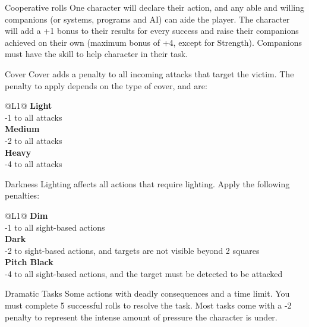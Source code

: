 \begin{genericsection}{Cooperative rolls}
One character will declare their action, and any able and willing companions (or systems, programs and AI) can aide the player. The character will add a +1 bonus to their results for every success and raise their companions achieved on their own (maximum bonus of +4, except for Strength). Companions must have the skill to help character in their task.
\end{genericsection}

\begin{genericsection}{Cover}
Cover adds a penalty to all incoming attacks that target the victim. The penalty to apply depends on the type of cover, and are:
\begin{redtable}{\linewidth}{@{}L{1}@{}}
  \textbf{Light} \\
  -1 to all attacks\\
  \textbf{Medium} \\
  -2 to all attacks\\
  \textbf{Heavy} \\
  -4 to all attacks\\
\end{redtable}
\end{genericsection}

\begin{genericsection}{Darkness}
Lighting affects all actions that require lighting. Apply the following penalties:
\begin{redtable}{\linewidth}{@{}L{1}@{}}
  \textbf{Dim} \\
  -1 to all sight-based actions\\
  \textbf{Dark} \\
  -2 to sight-based actions, and targets are not visible beyond 2 squares\\
  \textbf{Pitch Black} \\
  -4 to all sight-based actions, and the target must be detected to be attacked\\
\end{redtable}
\end{genericsection}

\begin{genericsection}{Dramatic Tasks}
Some actions with deadly consequences and a time limit. You must complete 5 successful rolls to resolve the task. Most tasks come with a -2 penalty to represent the intense amount of pressure the character is under.
\end{genericsection}

